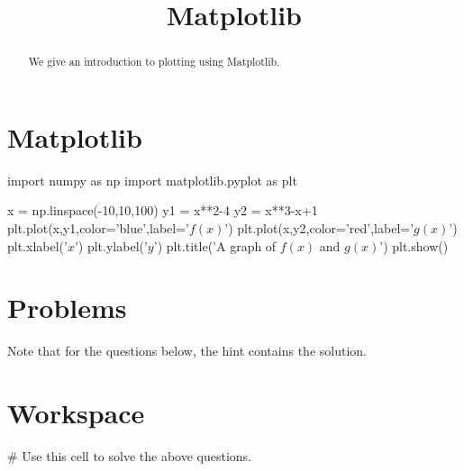 \documentclass{ximera}
\title{Matplotlib}
\begin{document}
  
\begin{abstract}  
We give an introduction to plotting using Matplotlib.
\end{abstract}  
\maketitle

\section{Matplotlib}


\begin{sageCell}
import numpy as np
import matplotlib.pyplot as plt

x = np.linspace(-10,10,100)
y1 = x**2-4
y2 = x**3-x+1
plt.plot(x,y1,color='blue',label='$f(x)$')
plt.plot(x,y2,color='red',label='$g(x)$')
plt.xlabel('$x$')
plt.ylabel('$y$')
plt.title('A graph of $f(x)$ and $g(x)$')
plt.show()
\end{sageCell}


\section{Problems}

Note that for the questions below, the hint contains the solution.

\begin{question}
\end{question}

\section{Workspace}

\begin{sageCell}
# Use this cell to solve the above questions.
\end{sageCell}
\end{document}
